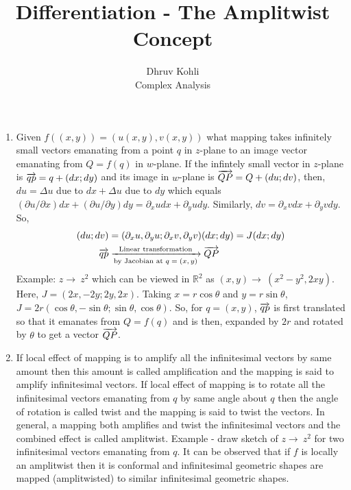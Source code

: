 \documentclass[12pt]{article}
\newcommand{\R}{\mathbb{R}}
\newcommand{\rto}{\rightarrow\ }
\def\xrto{\ensuremath\xrightarrow}
\def\rvec{\ensuremath\overrightarrow}
\begin{document}
 
 
\title{Differentiation - The Amplitwist Concept}%
\author{Dhruv Kohli\\ %
Complex Analysis} %
 
\maketitle
\begin{enumerate}
    \item Given $f((x,y)) = (u(x,y),v(x,y))$ what mapping takes infinitely small vectors emanating from a point $q$ in $z$-plane to an image vector emanating from $Q=f(q)$ in $w$-plane. If the infintely small vector in $z$-plane is $\rvec{qp}=q+(dx;dy)$ and its image in $w$-plane is $\rvec{QP} = Q + (du;dv)$, then, $du = \Delta u$ due to $dx + \Delta u$ due to $dy$ which equals $(\partial u/\partial x)dx + (\partial u/\partial y)dy = \partial_{x}udx + \partial_{y}udy$. Similarly, $dv=\partial_{x}vdx+\partial_{y}vdy$. So,
    \begin{align*}
        (du;dv) &= (\partial_{x}u,\partial_{y}u;\partial_{x}v,\partial_{y}v)(dx;dy) = J(dx;dy)\\
        \rvec{qp} &\xrto[\text{by Jacobian at $q=(x,y)$}]{\text{Linear transformation}} \rvec{QP}
    \end{align*}
    Example: $z\rto z^2$ which can be viewed in $\R^2$ as $(x,y)\rto(x^2-y^2,2xy)$. Here, $J = (2x,-2y;2y,2x)$. Taking $x=r\cos\theta$ and $y = r\sin\theta$, $J=2r(\cos\theta,-\sin\theta;\sin\theta,\cos\theta)$. So, for $q=(x,y)$, $\rvec{qp}$ is first translated so that it emanates from $Q=f(q)$ and is then, expanded by $2r$ and rotated by $\theta$ to get a vector $\rvec{QP}$.
    \item If local effect of mapping is to amplify all the infinitesimal vectors by same amount then this amount is called amplification and the mapping is said to amplify infinitesimal vectors. If local effect of mapping is to rotate all the infinitesimal vectors emanating from $q$ by same angle about $q$ then the angle of rotation is called twist and the mapping is said to twist the vectors. In general, a mapping both amplifies and twist the infinitesimal vectors and the combined effect is called amplitwist. Example - draw sketch of $z\rto z^2$ for two infinitesimal vectors emanating from $q$. It can be observed that if $f$ is locally an amplitwist then it is conformal and infinitesimal geometric shapes are mapped (amplitwisted) to similar infinitesimal geometric shapes.

\end{enumerate}
\end{document}
